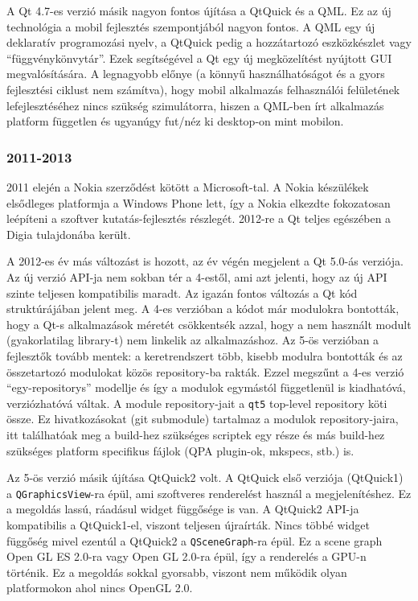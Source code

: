 \documentclass[12pt]{report}
\begin{document}
A Qt 4.7-es verzió másik nagyon fontos újítása a QtQuick és a QML.
Ez az új technológia a mobil fejlesztés szempontjából nagyon fontos. A QML egy
új deklaratív programozási nyelv, a QtQuick pedig a hozzátartozó eszközkészlet vagy
``függvénykönvytár''. Ezek segítségével a Qt egy új megközelítést nyújtott GUI
megvalósítására. A legnagyobb előnye (a könnyű használhatóságot és a gyors fejlesztési
ciklust nem számítva), hogy mobil alkalmazás felhasználói felületének
lefejlesztéséhez nincs szükség szimulátorra, hiszen a QML-ben írt alkalmazás
platform független és ugyanúgy fut/néz ki desktop-on mint mobilon.

\subsubsection{2011-2013}
2011 elején a Nokia szerződést kötött a Microsoft-tal. A Nokia készülékek elsődleges
platformja a Windows Phone lett, így a Nokia elkezdte fokozatosan leépíteni a
szoftver kutatás-fejlesztés részlegét. 2012-re a Qt teljes egészében a Digia
tulajdonába került.

A 2012-es év más változást is hozott, az év végén megjelent a Qt 5.0-ás verziója.
Az új verzió API-ja nem sokban tér a 4-estől, ami azt jelenti, hogy az új API szinte
teljesen kompatibilis maradt. Az igazán fontos változás a Qt kód struktúrájában jelent meg.
A 4-es verzióban a kódot már modulokra bontották, hogy a Qt-s alkalmazások méretét
csökkentsék azzal, hogy a nem használt modult (gyakorlatilag library-t) nem linkelik
az alkalmazáshoz. Az 5-ös verzióban a fejlesztők tovább mentek: a keretrendszert több,
kisebb modulra bontották és az összetartozó modulokat közös repository-ba rakták. Ezzel
megszűnt a 4-es verzió ``egy-repositorys'' modellje és így a modulok egymástól függetlenül
is kiadhatóvá, verziózhatóvá váltak.
A module repository-jait a \texttt{qt5} top-level repository köti össze.
Ez hivatkozásokat (git submodule) tartalmaz a modulok repository-jaira, itt találhatóak meg a
build-hez szükséges scriptek egy része és más build-hez szükséges platform specifikus fájlok
(QPA plugin-ok, mkspecs, stb.) is.

Az 5-ös verzió másik újítása QtQuick2 volt. A QtQuick első verziója (QtQuick1) a
\texttt{QGraphicsView}-ra épül, ami szoftveres renderelést használ a megjelenítéshez.
Ez a megoldás lassú, ráadásul widget függősége is van. A QtQuick2 API-ja kompatibilis a
QtQuick1-el, viszont teljesen újraírták. Nincs többé widget függőség mivel ezentúl a
QtQuick2 a \texttt{QSceneGraph}-ra épül. Ez a scene graph Open GL ES 2.0-ra vagy
Open GL 2.0-ra épül, így a renderelés a GPU-n történik. Ez a megoldás sokkal gyorsabb,
viszont nem működik olyan platformokon ahol nincs OpenGL 2.0.
\end{document}
